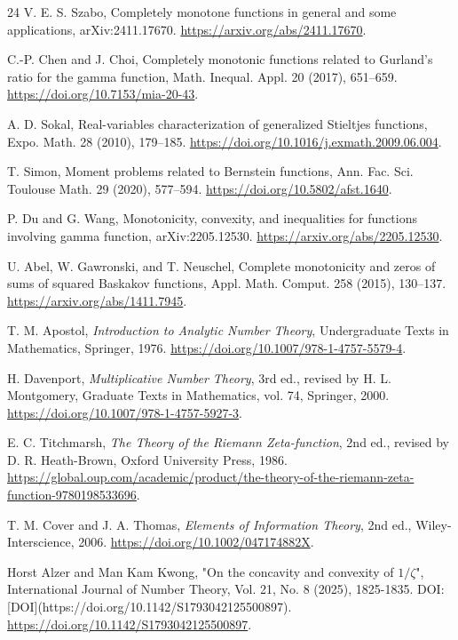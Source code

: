 \documentclass[11pt]{article}
\numberwithin{equation}{section}
\theoremstyle{definition}
\theoremstyle{remark}
\newcommand{\1}{\mathbf 1}
\begin{document}
\begin{thebibliography}{24}
V. E. S. Szabo,
\newblock Completely monotone functions in general and some applications,
\newblock arXiv:2411.17670.
\url{https://arxiv.org/abs/2411.17670}.

C.-P. Chen and J. Choi,
\newblock Completely monotonic functions related to Gurland's ratio for the
  gamma function,
\newblock Math. Inequal. Appl. 20 (2017), 651--659.
\url{https://doi.org/10.7153/mia-20-43}.

A. D. Sokal,
\newblock Real-variables characterization of generalized Stieltjes functions,
\newblock Expo. Math. 28 (2010), 179--185.
\url{https://doi.org/10.1016/j.exmath.2009.06.004}.

T. Simon,
\newblock Moment problems related to Bernstein functions,
\newblock Ann. Fac. Sci. Toulouse Math. 29 (2020), 577--594.
\url{https://doi.org/10.5802/afst.1640}.

P. Du and G. Wang,
\newblock Monotonicity, convexity, and inequalities for functions involving
  gamma function,
\newblock arXiv:2205.12530.
\url{https://arxiv.org/abs/2205.12530}.

U. Abel, W. Gawronski, and T. Neuschel,
\newblock Complete monotonicity and zeros of sums of squared Baskakov
  functions,
\newblock Appl. Math. Comput. 258 (2015), 130--137.
\url{https://arxiv.org/abs/1411.7945}.

T. M. Apostol,
\emph{Introduction to Analytic Number Theory},
Undergraduate Texts in Mathematics, Springer, 1976.
\url{https://doi.org/10.1007/978-1-4757-5579-4}.

H. Davenport,
\emph{Multiplicative Number Theory},
3rd ed., revised by H. L. Montgomery, Graduate Texts in Mathematics, vol. 74, Springer, 2000.
\url{https://doi.org/10.1007/978-1-4757-5927-3}.

E. C. Titchmarsh,
\emph{The Theory of the Riemann Zeta-function},
2nd ed., revised by D. R. Heath-Brown, Oxford University Press, 1986.
\url{https://global.oup.com/academic/product/the-theory-of-the-riemann-zeta-function-9780198533696}.

T. M. Cover and J. A. Thomas,
\emph{Elements of Information Theory},
2nd ed., Wiley-Interscience, 2006.
\url{https://doi.org/10.1002/047174882X}.

Horst Alzer and Man Kam Kwong, "On the concavity and convexity of \(1/\zeta\)", International Journal of Number Theory, Vol. 21, No. 8 (2025), 1825-1835. DOI: [DOI](https://doi.org/10.1142/S1793042125500897).
\url{https://doi.org/10.1142/S1793042125500897}.


\end{thebibliography}
\end{document}
